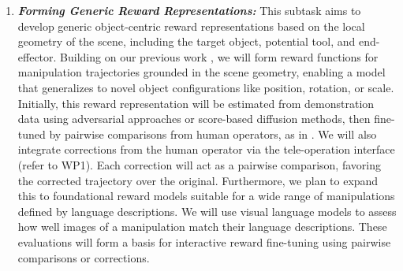 \documentclass{erc-B2}
\begin{document}
\begin{enumerate}
\item \textit{\textbf{Forming Generic Reward Representations:}} 
This subtask aims to develop generic object-centric reward representations based on the local geometry of the scene, including the target object, potential tool, and end-effector. Building on our previous work \cite{freymuth2022vigor}, we will form reward functions for manipulation trajectories grounded in the scene geometry, enabling a model that generalizes to novel object configurations like position, rotation, or scale. Initially, this reward representation will be estimated from demonstration data using adversarial approaches or score-based diffusion methods, then fine-tuned by pairwise comparisons from human operators, as in \cite{taranovic2023ailp}. We will also integrate corrections from the human operator via the tele-operation interface (refer to WP1). Each correction will act as a pairwise comparison, favoring the corrected trajectory over the original.
Furthermore, we plan to expand this to foundational reward models suitable for a wide range of manipulations defined by language descriptions. We will use visual language models \cite{CLIP,LLaMA} to assess how well images of a manipulation match their language descriptions. These evaluations will form a basis for interactive reward fine-tuning using pairwise comparisons or corrections.  


\end{enumerate}
\end{document}
